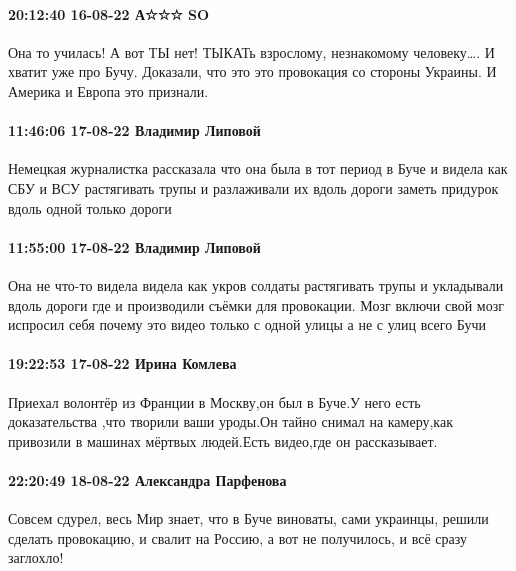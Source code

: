 \paragraph{20:12:40 16-08-22 А☆☆☆ SO}

Она то училась! А вот ТЫ нет! ТЫКАТь взрослому, незнакомому человеку…. И хватит
уже про Бучу. Доказали, что это это провокация со стороны Украины. И Америка и
Европа это признали.

\paragraph{11:46:06 17-08-22 Владимир Липовой}

Немецкая журналистка рассказала что она была в тот период в Буче и видела как
СБУ и ВСУ растягивать трупы и разлаживали их вдоль дороги заметь придурок вдоль
одной только дороги

\paragraph{11:55:00 17-08-22 Владимир Липовой}

Она не что-то видела видела как укров солдаты растягивать трупы и укладывали
вдоль дороги где и производили съёмки для провокации. Мозг включи свой мозг
испросил себя почему это видео только с одной улицы а не с улиц всего Бучи

\paragraph{19:22:53 17-08-22 Ирина Комлева}

Приехал волонтёр из Франции в Москву,он был в Буче.У него есть доказательства
,что творили ваши уроды.Он тайно снимал на камеру,как привозили в машинах
мёртвых людей.Есть видео,где он рассказывает.

\paragraph{22:20:49 18-08-22 Александра Парфенова}

Совсем сдурел, весь Мир знает, что в Буче виноваты, сами украинцы, решили
сделать провокацию, и свалит на Россию, а вот не получилось, и всё сразу
заглохло!
